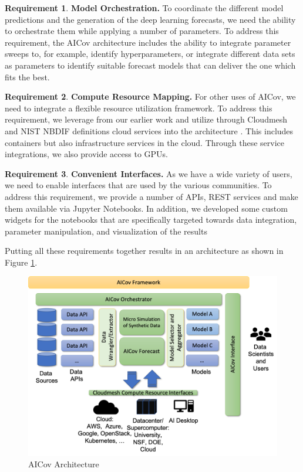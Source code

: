 \documentclass[12pt]{article}
\theoremstyle{definition}
\newtheorem{requirement}{Requirement}
\renewcommand{\_}{%
    \textunderscore\hspace{0pt}%
}
\begin{document}
\begin{requirement}{\bf Model Orchestration.} To coordinate the different model predictions and the generation of the deep learning forecasts, we need the ability to orchestrate them while applying a number of parameters. \Solution To address this requirement, the AICov architecture includes the ability to integrate parameter sweeps to, for example, identify hyperparameters, or integrate different data sets as parameters to identify suitable forecast models that can deliver the one which fits the best.
\end{requirement}

\begin{requirement}{\bf Compute Resource Mapping.} For other uses of AICov, we need to integrate a flexible resource utilization framework. \Solution To address this requirement, we leverage from our earlier work and utilize through Cloudmesh and NIST NBDIF definitions cloud services into the architecture \cite{las-19-nist}. This includes containers but also infrastructure services in the cloud. Through these service integrations, we also provide access to  GPUs.
\end{requirement}

\begin{requirement}{\bf Convenient Interfaces.} As we have a wide variety of users, we need to enable interfaces that are used by the various communities. \Solution To address this requirement, we provide a number of APIs, REST services and make them available via Jupyter Notebooks. In addition, we developed some custom widgets for the notebooks that are specifically targeted towards data integration, parameter manipulation, and visualization of the results 
\end{requirement}


Putting all these requirements together results in an architecture as shown in Figure \ref{fig:arch}.\\

\begin{figure}[h!]
    \centering
    \includegraphics[width=0.6\columnwidth]{images/arch.pdf}
    \caption{AICov Architecture}
    \label{fig:arch}
\end{figure}
\end{document}
